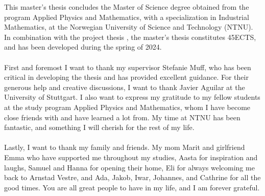 This master's thesis concludes the Master of Science degree obtained from the program Applied Physics and Mathematics, with a specialization in Industrial Mathematics, at the Norwegian University of Science and Technology (NTNU). In combination with the project thesis \citep{Arnstad:Relative_variable_importance_in_Bayesian_linear_mixed_models:2024}, the master's thesis constitutes 45ECTS, and has been developed during the spring of 2024.
\\
\\
First and foremost I want to thank my supervisor Stefanie Muff, who has been critical in developing the thesis and has provided excellent guidance. For their generous help and creative discussions, I want to thank Javier Aguilar at the University of Stuttgart. I also want to express my gratitude to my fellow students at the study program Applied Physics and Mathematics, whom I have become close friends with and have learned a lot from. My time at NTNU has been fantastic, and something I will cherish for the rest of my life. 
\\
\\
Lastly, I want to thank my family and friends. My mom Marit and girlfriend Emma who have supported me throughout my studies, Aasta for inspiration and laughs, Samuel and Hanna for opening their home, Eli for always welcoming me back to Arnstad Vestre, and Ada, Jakob, Iwar, Johannes, and Cathrine for all the good times. You are all great people to have in my life, and I am forever grateful. 
\\ %
